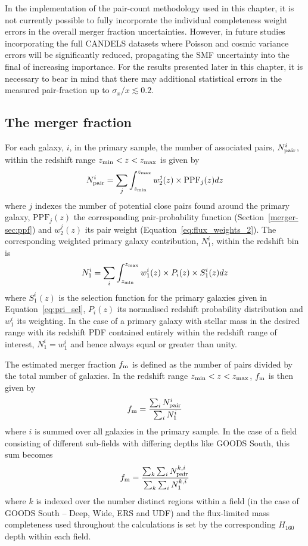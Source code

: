 In the implementation of the pair-count methodology used in this chapter, it is not currently possible to fully incorporate the individual completeness weight errors in the overall merger fraction uncertainties. However, in future studies incorporating the full CANDELS datasets where Poisson and cosmic variance errors will be significantly reduced, propagating the SMF uncertainty into the final of increasing importance. For the results presented later in this chapter, it is necessary to bear in mind that there may additional statistical errors in the measured pair-fraction up to $\sigma_{x}/x \lesssim 0.2$.

\subsection{The merger fraction}\label{merger-sec:pair_frac}
For each galaxy, $i$, in the primary sample, the number of associated pairs, $N_{\rm{pair}}^{i}$, within the redshift range $z_{\rm{min}} < z < z_{\rm{max}}$ is given by
\begin{equation}
N_{\text{pair}}^{i} = \sum_{j} \int_{z_{\rm{min}}}^{z_{\rm{max}}} w_{\text{2}}^{j}(z)\times \text{PPF}_{j}(z) dz	
\end{equation}
where $j$ indexes the number of potential close pairs found around the primary galaxy, $\text{PPF}_{j}(z)$ the corresponding pair-probability function (Section~\ref{merger-sec:ppf}) and $w_{\text{2}}^{j}(z)$ its pair weight (Equation~\ref{eq:flux_weights_2}). The corresponding weighted primary galaxy contribution, $N_{1}^{i}$, within the redshift bin is
\begin{equation}
 N_{1}^{i} = \sum_{i}\int_{z_{\rm{min}}}^{z_{\rm{max}}} w_{1}^{i}(z) \times P_{i}(z) \times S_{1}^{i}(z){} dz	
\end{equation} 
where $S_{1}^{i}(z)$ is the selection function for the primary galaxies given in Equation~\ref{eq:pri_sel}, $P_{i}(z)$ its normalised redshift probability distribution and $w_{1}^{i}$ its weighting. In the case of a primary galaxy with stellar mass in the desired range with its redshift PDF contained entirely within the redshift range of interest, $N_{1}^{i} = w_{1}^{i}$ and hence always equal or greater than unity.

The estimated merger fraction $f_{\rm{m}}$ is defined as the number of pairs divided by the total number of galaxies. In the redshift range $z_{\rm{min}} < z < z_{\rm{max}}$,  $f_{\rm{m}}$ is then given by 
\begin{equation}
f_{\rm{m}} = \frac{\sum_{i} N_{\text{pair}}^{i}}{\sum_{i} N_{1}^{i}}
\end{equation}
where $i$ is summed over all galaxies in the primary sample. In the case of a field consisting of different sub-fields with differing depths like GOODS South, this sum becomes 
\begin{equation}
f_{\rm{m}} = \frac{\sum_{k}\sum_{i} N_{\text{pair}}^{k,i}}{\sum_{k}\sum_{i} N_{1}^{k,i}}
\end{equation}
where $k$ is indexed over the number distinct regions within a field (in the case of GOODS South -- Deep, Wide, ERS and UDF) and the flux-limited mass completeness used throughout the calculations is set by the corresponding $H_{160}$ depth within each field.


